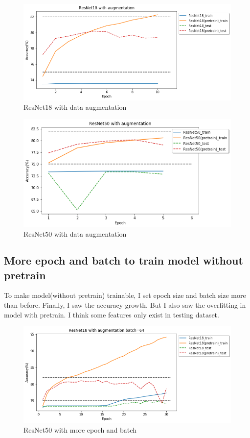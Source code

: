 \documentclass[12pt]{article}
\begin{document}
\begin{figure}[H]
\centering
\includegraphics[width=\linewidth]{Images/ResNet18withDA.png}
\caption{ResNet18 with data augmentation}
\end{figure}

\begin{figure}[H]
\centering
\includegraphics[width=\linewidth]{Images/ResNet50withDA.png}
\caption{ResNet50 with data augmentation}
\end{figure}

\subsection{More epoch and batch to train model without pretrain}

To make model(without pretrain) trainable, I set epoch size and batch size more than before. Finally, I saw the accuracy growth. But I also saw the overfitting in model with pretrain. I think some features only exist in testing dataset.

\begin{figure}[H]
\centering
\includegraphics[width=\linewidth]{Images/ResNet18withLE.png}
\caption{ResNet50 with more epoch and batch}
\end{figure}
\end{document}
